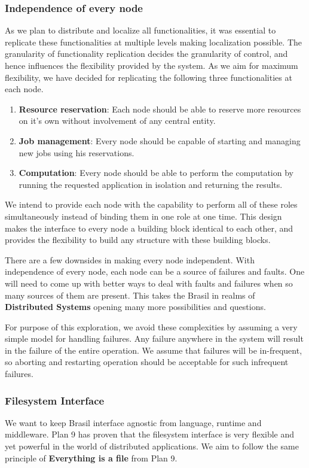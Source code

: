 \documentclass[conference]{sig-alternate}
\begin{document}
\subsubsection{Independence of every node}
As we plan to distribute and localize all functionalities, it was essential to
replicate these functionalities at multiple levels making localization
possible.  The granularity of functionality replication decides the granularity of control,
and hence influences the flexibility provided by the system.  As we aim for 
maximum flexibility, we have decided for replicating the following three
functionalities at each node.
\begin{enumerate}
\item \textbf{Resource reservation}: Each node should be able to reserve more
resources on it's own without involvement of any central entity.

\item \textbf{Job management}: Every node should be capable of starting and
managing new jobs using his reservations.

\item \textbf{Computation}: Every node should be able to perform the
computation by running the requested application in isolation and returning
the results.
\end{enumerate}

We intend to provide each node with the capability to perform all of these roles
simultaneously instead of binding them in one role at one time.  This design
makes the interface to every node a building block identical to each other, 
and provides the flexibility to build any structure with these building blocks.

There are a few downsides in making every node independent.  With independence
of every node, each node can be a source of failures and faults.
One will need to come up with better ways to deal with faults and
failures when so many sources of them are present.  This takes the Brasil in
realms of \textbf{Distributed Systems} opening many more possibilities and
questions.

For purpose of this exploration, we avoid these complexities by assuming a very
simple model for handling failures.  Any failure anywhere in the system will
result in the failure of the entire operation.  We assume that failures will
be in-frequent, so aborting and restarting operation should be acceptable for
such infrequent failures.

\subsubsection{Filesystem Interface}
We want to keep Brasil interface agnostic from language, runtime and middleware.
Plan 9 has proven that the filesystem interface is very flexible and yet
powerful in the world of distributed applications.  We aim to follow the same
principle of \textbf{Everything is a file} from Plan 9.
\end{document}
